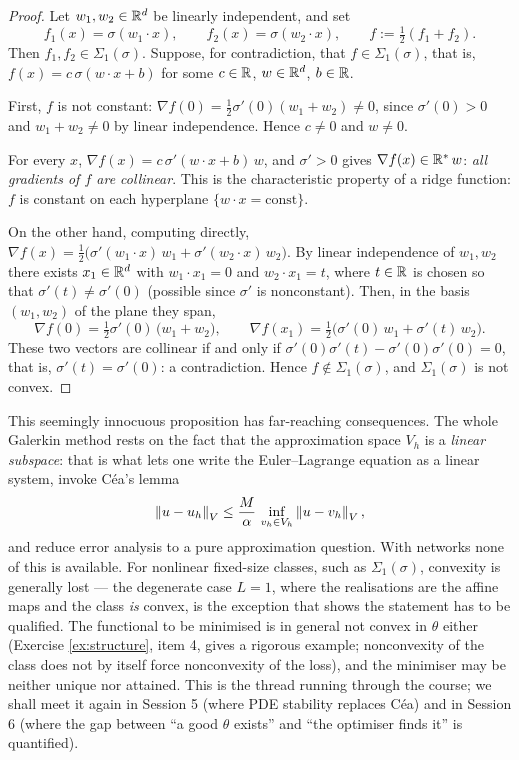 \documentclass[11pt,a4paper]{article}
\begin{document}
\begin{proof}
Let $w_1, w_2 \in \mathbb{R}^d$ be linearly independent, and set
\[
f_1(x) = \sigma(w_1\cdot x), \qquad f_2(x) = \sigma(w_2 \cdot x), \qquad
f := \tfrac12 (f_1 + f_2).
\]
Then $f_1, f_2 \in \Sigma_1(\sigma)$. Suppose, for contradiction, that $f \in \Sigma_1(\sigma)$,
that is, $f(x) = c\,\sigma(w\cdot x + b)$ for some $c \in \mathbb{R}$, $w \in \mathbb{R}^d$, $b \in \mathbb{R}$.

First, $f$ is not constant: $\nabla f(0) = \tfrac12 \sigma'(0)(w_1 + w_2) \ne 0$, since
$\sigma'(0) > 0$ and $w_1 + w_2 \ne 0$ by linear independence. Hence $c \ne 0$ and $w \ne 0$.

For every $x$, $\nabla f(x) = c\,\sigma'(w\cdot x + b)\, w$, and $\sigma' > 0$ gives
$\nabla f(x) \in \mathbb{R}^*\, w$: \emph{all gradients of $f$ are collinear}. This is the characteristic
property of a ridge function: $f$ is constant on each hyperplane $\{w\cdot x = \text{const}\}$.

On the other hand, computing directly,
$\nabla f(x) = \tfrac12\big( \sigma'(w_1\cdot x)\, w_1 + \sigma'(w_2 \cdot x)\, w_2 \big)$.
By linear independence of $w_1, w_2$ there exists $x_1 \in \mathbb{R}^d$ with $w_1 \cdot x_1 = 0$ and
$w_2 \cdot x_1 = t$, where $t \in \mathbb{R}$ is chosen so that $\sigma'(t) \ne \sigma'(0)$ (possible since
$\sigma'$ is nonconstant). Then, in the basis $(w_1,w_2)$ of the plane they span,
\[
\nabla f(0) = \tfrac12 \sigma'(0)\,\big(w_1 + w_2\big),
\qquad
\nabla f(x_1) = \tfrac12 \big( \sigma'(0)\, w_1 + \sigma'(t)\, w_2\big).
\]
These two vectors are collinear if and only if
$\sigma'(0)\sigma'(t) - \sigma'(0)\sigma'(0) = 0$, that is, $\sigma'(t) = \sigma'(0)$: a
contradiction. Hence $f \notin \Sigma_1(\sigma)$, and $\Sigma_1(\sigma)$ is not convex.
\end{proof}

\begin{remark}\label{rem:cealost}
This seemingly innocuous proposition has far-reaching consequences. The whole Galerkin method rests
on the fact that the approximation space $V_h$ is a \emph{linear subspace}: that is what lets one
write the Euler--Lagrange equation as a linear system, invoke Céa's lemma
\[
\left\lVert u - u_h \right\rVert_{V} \le \frac{M}{\alpha}\, \inf_{v_h \in V_h} \left\lVert u - v_h \right\rVert_V ,
\]
and reduce error analysis to a pure approximation question. With networks none of this is available. For nonlinear fixed-size classes, such as
$\Sigma_1(\sigma)$, convexity is generally lost --- the degenerate case $L = 1$, where the
realisations are the affine maps and the class \emph{is} convex, is the exception that shows the
statement has to be qualified. The functional to be minimised is in general not convex in $\theta$
either (Exercise \ref{ex:structure}, item 4, gives a rigorous example; nonconvexity of the class
does not by itself force nonconvexity of the loss), and the minimiser may be neither unique nor
attained. This is the thread running through the course; we
shall meet it again in Session 5 (where PDE stability replaces Céa) and in Session 6 (where the gap
between ``a good $\theta$ exists'' and ``the optimiser finds it'' is quantified).
\end{remark}
\end{document}
